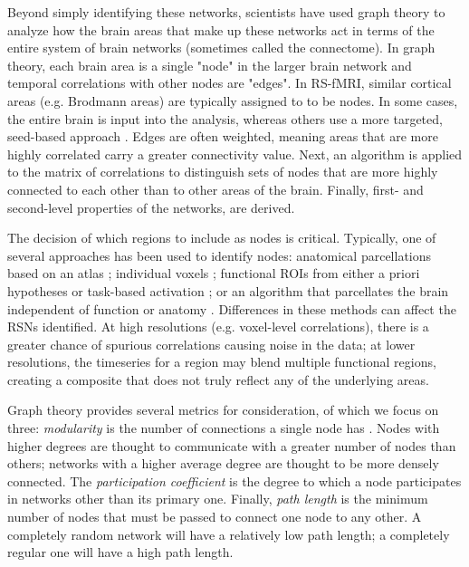 Beyond simply identifying these networks, scientists have used graph theory to analyze how the brain areas that make up these networks act in terms of the entire system of brain networks (sometimes called the connectome). In graph theory, each brain area is a single "node" in the larger brain network and temporal correlations with other nodes are "edges". In RS-fMRI, similar cortical areas (e.g. Brodmann areas) are typically assigned to to be nodes. In some cases, the entire brain is input into the analysis, whereas others use a more targeted, seed-based approach \citep{Vogel2010}.  Edges are often weighted, meaning areas that are more highly correlated carry a greater connectivity value. Next, an algorithm is applied to the matrix of correlations to distinguish sets of nodes that are more highly connected to each other than to other areas of the brain. Finally, first- and second-level properties of the networks, are derived.

The decision of which regions to include as nodes is critical. Typically, one of several approaches has been used to identify nodes: anatomical parcellations based on an atlas \citep{Supekar2008, Liu2008, Lynall2010}; individual voxels \citep{Fair2007}; functional ROIs from either a priori hypotheses or task-based activation \citep{VandenHeuvel2010}; or an algorithm that parcellates the brain independent of function or anatomy \citep{Goni2014}.  Differences in these methods can affect the RSNs identified. At high resolutions (e.g. voxel-level correlations), there is a greater chance of spurious correlations causing noise in the data; at lower resolutions, the timeseries for a region may blend multiple functional regions, creating a composite that does not truly reflect any of the underlying areas. 

Graph theory provides several metrics for consideration, of which we focus on three: \textit{modularity} is the number of connections a single node has \citep{Sporns2013}. Nodes with higher degrees are thought to communicate with a greater number of nodes than others; networks with a higher average degree are thought to be more densely connected.  The \textit{participation coefficient} is the degree to which a node participates in networks other than its primary one. Finally, \textit{path length} is the minimum number of nodes that must be passed to connect one node to any other. A completely random network will have a relatively low path length; a completely regular one will have a high path length. 

